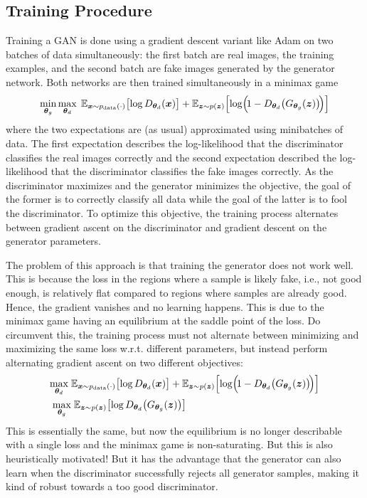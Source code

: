 		\subsection{Training Procedure}
			Training a GAN is done using a gradient descent variant like Adam on two batches of data simultaneously: the first batch are real images, the training examples, and the second batch are fake images generated by the generator network. Both networks are then trained simultaneously in a minimax game
			\begin{equation}
				\min_{\bm{\theta}_g} \max_{\bm{\theta}_d} \; \mathbb{E}_{\bm{x} \sim p_\mathrm{data}(\cdot)}\big[\! \log D_{\bm{\theta}_d}(\bm{x}) \big] + \mathbb{E}_{\bm{z} \sim p(\bm{z})}\Big[\! \log\!\Big(\! 1 - D_{\bm{\theta}_d}\big( G_{\bm{\theta}_g}(\bm{z}) \big) \!\Big) \Big]
			\end{equation}
			where the two expectations are (as usual) approximated using minibatches of data. The first expectation describes the log-likelihood that the discriminator classifies the real images correctly and the second expectation described the log-likelihood that the discriminator classifies the fake images correctly. As the discriminator maximizes and the generator minimizes the objective, the goal of the former is to correctly classify all data while the goal of the latter is to fool the discriminator. To optimize this objective, the training process alternates between gradient ascent on the discriminator and gradient descent on the generator parameters.

			The problem of this approach is that training the generator does not work well. This is because the loss in the regions where a sample is likely fake, i.e., not good enough, is relatively flat compared to regions where samples are already good. Hence, the gradient vanishes and no learning happens. This is due to the minimax game having an equilibrium at the saddle point of the loss. Do circumvent this, the training process must not alternate between minimizing and maximizing the same loss w.r.t. different parameters, but instead perform alternating gradient ascent on two different objectives:
			\begin{align}
				\max_{\bm{\theta}_d} \;& \mathbb{E}_{\bm{x} \sim p_\mathrm{data}(\cdot)}\big[\! \log D_{\bm{\theta}_d}(\bm{x}) \big] + \mathbb{E}_{\bm{z} \sim p(\bm{z})}\Big[\! \log\!\Big(\! 1 - D_{\bm{\theta}_d}\big( G_{\bm{\theta}_g}(\bm{z}) \big) \!\Big) \Big] \\
				\max_{\bm{\theta}_g} &\; \mathbb{E}_{\bm{z} \sim p(\bm{z})}\big[\! \log D_{\bm{\theta}_d}\big( G_{\bm{\theta}_g}(\bm{z}) \big) \big]
			\end{align}
			This is essentially the same, but now the equilibrium is no longer describable with a single loss and the minimax game is non-saturating. But this is also heuristically motivated! But it has the advantage that the generator can also learn when the discriminator successfully rejects all generator samples, making it kind of robust towards a too good discriminator.

